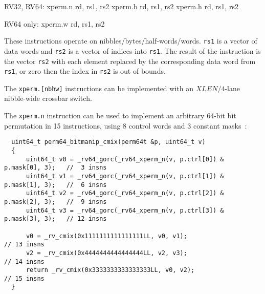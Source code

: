 \begin{rvb}
  RV32, RV64:
    xperm.n rd, rs1, rs2
    xperm.b rd, rs1, rs2
    xperm.h rd, rs1, rs2

  RV64 only:
    xperm.w rd, rs1, rs2
\end{rvb}

These instructions operate on nibbles/bytes/half-words/words. {\tt rs1} is
a vector of data words and {\tt rs2} is a vector of indices into {\tt rs1}.
The result of the instruction is the vector {\tt rs2} with each element replaced
by the corresponding data word from {\tt rs1}, or zero then the index in {\tt rs2}
is out of bounds.



The \texttt{xperm.[nbhw]} instructions can be implemented with an $XLEN/4$-lane
nibble-wide crossbar switch.

The \texttt{xperm.n} instruction can be used to implement an arbitrary 64-bit
bit permutation in 15 instructions, using 8 control words and 3 constant masks~\cite{Wolf20A}:

\begin{minipage}{\linewidth}
\begin{verbatim}
  uint64_t perm64_bitmanip_cmix(perm64t &p, uint64_t v)
  {
      uint64_t v0 = _rv64_gorc(_rv64_xperm_n(v, p.ctrl[0]) & p.mask[0], 3);   //  3 insns
      uint64_t v1 = _rv64_gorc(_rv64_xperm_n(v, p.ctrl[1]) & p.mask[1], 3);   //  6 insns
      uint64_t v2 = _rv64_gorc(_rv64_xperm_n(v, p.ctrl[2]) & p.mask[2], 3);   //  9 insns
      uint64_t v3 = _rv64_gorc(_rv64_xperm_n(v, p.ctrl[3]) & p.mask[3], 3);   // 12 insns

      v0 = _rv_cmix(0x1111111111111111LL, v0, v1);                            // 13 insns
      v2 = _rv_cmix(0x4444444444444444LL, v2, v3);                            // 14 insns
      return _rv_cmix(0x3333333333333333LL, v0, v2);                          // 15 insns
  }
\end{verbatim}
\end{minipage}



